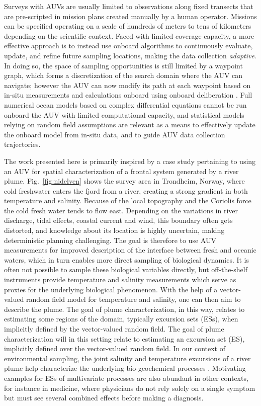 \documentclass[aoas,preprint]{imsart}
\begin{document}
Surveys with AUVs are usually limited to observations along fixed
transects that are pre-scripted in mission plans created manually by a
human operator. Missions can be specified operating on a scale of
hundreds of meters to tens of kilometers depending on the scientific
context. Faced with limited coverage capacity, a more effective
approach is to instead use onboard algorithms to continuously
evaluate, update, and refine future sampling locations, making the
data collection \emph{adaptive}.  In doing so, the space of sampling
opportunities is still limited by a waypoint graph, which forms a
discretization of the search domain where the AUV can navigate;
however the AUV can now modify its path at each waypoint based on
in-situ measurements and calculations onboard using onboard
deliberation \citep{py10,Rajan12,Rajan12b}.  Full numerical ocean
models based on complex differential equations cannot be run onboard
the AUV with limited computational capacity, and statistical models
relying on random field assumptions are relevant as a means to
effectively update the onboard model from in-situ data, and to guide
AUV data collection trajectories.

The work presented here is primarily inspired by a case study
pertaining to using an AUV for spatial characterization of a frontal
system generated by a river plume. Fig.~\ref{fig:nidelven} shows the
survey area in Trondheim, Norway, where cold freshwater enters the fjord from a river, creating a strong gradient in both temperature and
salinity. Because of the local topography and the Coriolis force the
cold fresh water tends to flow east. Depending on the variations in
river discharge, tidal effects, coastal current and wind, this
boundary often gets distorted, and knowledge about its location is
highly uncertain, making deterministic planning challenging. The goal
is therefore to use AUV measurements for improved description of the
interface between fresh and oceanic waters, which in turn enables more direct sampling of biological dynamics. It is often not possible
to sample these biological variables directly, but off-the-shelf instruments provide temperature and
salinity measurements which serve as proxies for the underlying
biological phenomenon. With the help of a vector-valued random field
model for temperature and salinity, one can then aim to describe the
plume. The goal of plume characterization, in this way, relates to
estimating some regions of the domain, typically excursion
sets (ESs), when implicitly defined by the vector-valued random field. The goal of plume characterization will in this setting relate to estimating an excursion set (ES), implicitly defined over the vector-valued random field. 
In our context of environmental sampling, the joint salinity and
temperature excursions of a river plume help characterize the
underlying bio-geochemical processes
\citep{hopkins2013detection,Pinto2018}. Motivating examples for ESs of
multivariate processes are also abundant in other contexts, for
instance in medicine, where physicians do not rely solely on a single
symptom but must see several combined effects before making a
diagnosis.
\end{document}
